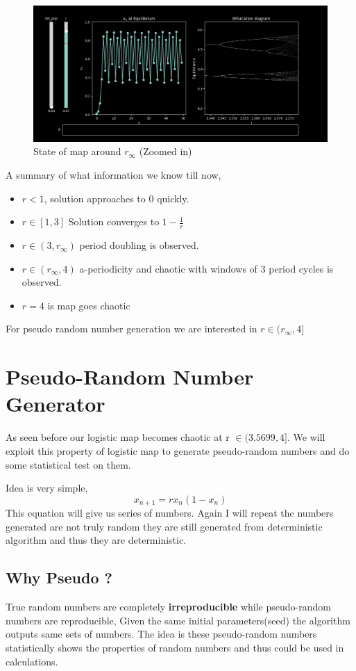 \documentclass{report}
\begin{document}
\begin{figure}[!h]
    \centering
    \includegraphics[scale=.45]{images/rinfi.png}
    \caption{State of map around $r_{\infty}$ (Zoomed in)}
    \label{fig:my_label7}
\end{figure}

A summary of what information we know till now,

\begin{itemize}
  \item $r < 1$, solution approaches to 0 quickly.
  \item $r \in [1,3]$ Solution converges to $1-\frac{1}{r}$
  \item $r\in (3,r_{\infty})$ period doubling is observed.
  \item $r\in (r_{\infty},4)$ a-periodicity and chaotic with windows  of 3 period  cycles is observed.
  \item $r=4$ is map goes chaotic
\end{itemize}
For pseudo random number generation we are interested in $r \in (r_{\infty},4]$
\newpage

\section{Pseudo-Random Number Generator}

As seen before our logistic map becomes chaotic at r $\in (3.5699,4]$. We will exploit this property of logistic map to generate pseudo-random numbers and do some statistical test on them.

Idea is very simple,
\begin{equation}
    x_{n+1} = rx_n(1-x_n) \nonumber
\end{equation}
This equation will give us series of numbers. Again I will repeat the numbers generated are not truly random they are still generated from deterministic algorithm and thus they are deterministic.
\subsection{Why Pseudo ?}
True random numbers are completely \textbf{irreproducible} while pseudo-random numbers are reproducible, Given the same initial parameters(seed) the algorithm outputs same sets of numbers. The idea is these pseudo-random numbers statistically shows the properties of random numbers and thus could be used in calculations.
\newline
\end{document}
